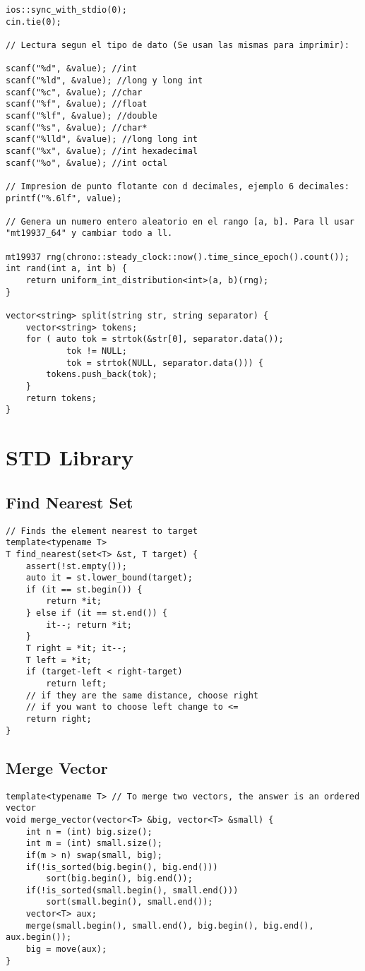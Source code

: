 \documentclass[10pt,letterpaper,twocolumn,twosided]{article}
\begin{document}
\begin{lstlisting}
ios::sync_with_stdio(0);
cin.tie(0);

// Lectura segun el tipo de dato (Se usan las mismas para imprimir):

scanf("%d", &value); //int
scanf("%ld", &value); //long y long int
scanf("%c", &value); //char 
scanf("%f", &value); //float
scanf("%lf", &value); //double
scanf("%s", &value); //char*
scanf("%lld", &value); //long long int
scanf("%x", &value); //int hexadecimal
scanf("%o", &value); //int octal

// Impresion de punto flotante con d decimales, ejemplo 6 decimales:
printf("%.6lf", value);

// Genera un numero entero aleatorio en el rango [a, b]. Para ll usar "mt19937_64" y cambiar todo a ll.

mt19937 rng(chrono::steady_clock::now().time_since_epoch().count());
int rand(int a, int b) {
    return uniform_int_distribution<int>(a, b)(rng);
}

vector<string> split(string str, string separator) {
    vector<string> tokens;
    for ( auto tok = strtok(&str[0], separator.data());
            tok != NULL;
            tok = strtok(NULL, separator.data())) {
        tokens.push_back(tok);
    }
    return tokens;
}
\end{lstlisting}



\section{STD Library}

\subsection{Find Nearest Set}
\begin{lstlisting}
// Finds the element nearest to target
template<typename T>
T find_nearest(set<T> &st, T target) {
    assert(!st.empty());
    auto it = st.lower_bound(target);
    if (it == st.begin()) {
        return *it;
    } else if (it == st.end()) {
        it--; return *it;
    }
    T right = *it; it--;
    T left = *it;
    if (target-left < right-target) 
        return left;
    // if they are the same distance, choose right
    // if you want to choose left change to <=
    return right;
}
\end{lstlisting}


\subsection{Merge Vector}
\begin{lstlisting}
template<typename T> // To merge two vectors, the answer is an ordered vector
void merge_vector(vector<T> &big, vector<T> &small) {
    int n = (int) big.size();
    int m = (int) small.size();
    if(m > n) swap(small, big);
    if(!is_sorted(big.begin(), big.end()))
        sort(big.begin(), big.end());
    if(!is_sorted(small.begin(), small.end()))
        sort(small.begin(), small.end());
    vector<T> aux;
    merge(small.begin(), small.end(), big.begin(), big.end(), aux.begin());
    big = move(aux);
}
\end{lstlisting}
\end{document}
